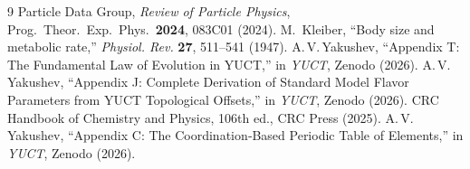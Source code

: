 \documentclass[12pt,a4paper]{article}
\begin{document}
	\begin{thebibliography}{9}
		 Particle Data Group, \emph{Review of Particle Physics},
		Prog.\ Theor.\ Exp.\ Phys.\ \textbf{2024}, 083C01 (2024).
		 M.~Kleiber, ``Body size and metabolic rate,''
		\emph{Physiol. Rev.} \textbf{27}, 511--541 (1947).
		 A.\,V.\,Yakushev, ``Appendix T: The Fundamental Law
		of Evolution in YUCT,'' in \emph{YUCT}, Zenodo (2026).
		 A.\,V.\,Yakushev, ``Appendix J: Complete Derivation of
		Standard Model Flavor Parameters from YUCT Topological
		Offsets,'' in \emph{YUCT}, Zenodo (2026).
		 CRC Handbook of Chemistry and Physics, 106th ed.,
		CRC Press (2025).
		 A.\,V.\,Yakushev, ``Appendix C: The Coordination‑Based
		Periodic Table of Elements,'' in \emph{YUCT}, Zenodo (2026).
	\end{thebibliography}
	
\end{document}
